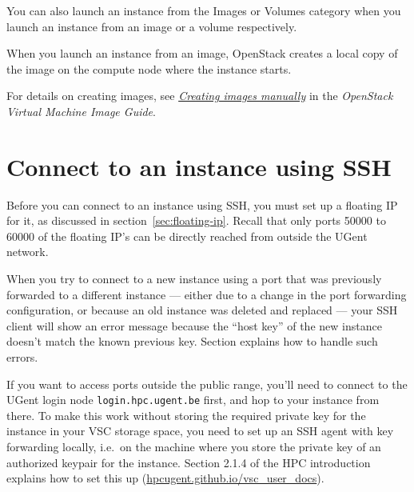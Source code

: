 You can also launch an instance from the Images or Volumes category when
you launch an instance from an image or a volume respectively.

When you launch an instance from an image, OpenStack creates a local
copy of the image on the compute node where the instance starts.

For details on creating images, see
\href{https://docs.openstack.org/image-guide/create-images-manually.html}{\emph{Creating
images manually}} in the \emph{OpenStack Virtual Machine Image Guide}.

\section{Connect to an instance using SSH}\label{connect-to-your-instance-using-ssh}
Before you can connect to an instance using SSH, you must set up a
floating IP for it, as discussed in section~\ref{sec:floating-ip}.
Recall that only ports 50000 to 60000 of the floating IP's can be
directly reached from outside the UGent network.

 When you try to connect to a new instance using a port
that was previously forwarded to a different instance --- either due
to a change in the port forwarding configuration, or because an old
instance was deleted and replaced --- your SSH client will show an
error message because the ``host key'' of the new instance doesn't
match the known previous key.  Section 
explains how to handle such errors.

 If you want to access ports outside the public range,
you'll need to connect to the UGent login node
\lstinline{login.hpc.ugent.be} first, and hop to your instance from
there.  To make this work without storing the required private key for
the instance in your VSC storage space, you need to set up an SSH
agent with key forwarding locally, i.e.\ on the machine where you
store the private key of an authorized keypair for the instance.
Section 2.1.4 of the HPC introduction explains how to set this up
(\href{https://hpcugent.github.io/vsc\_user\_docs}{hpcugent.github.io/vsc\_user\_docs}).

